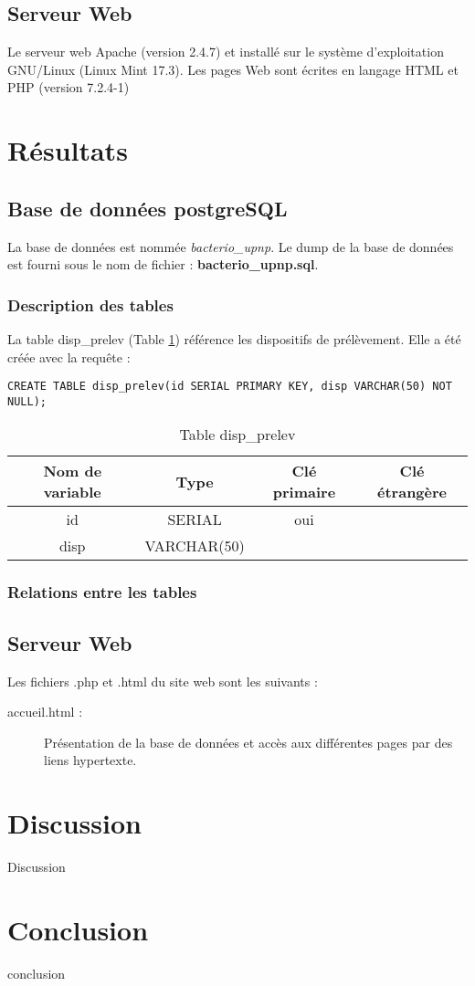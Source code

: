 \documentclass[12pt,a4paper,oneside]{article}
\begin{document}
\subsection{Serveur Web}
Le serveur web Apache (version 2.4.7) et installé sur le système d'exploitation GNU/Linux (Linux Mint 17.3).
Les pages Web sont écrites en langage HTML et PHP (version 7.2.4-1)

\section{Résultats}
\subsection{Base de données postgreSQL}
La base de données est nommée \emph{bacterio\_upnp}. Le dump de la base de données est fourni sous le nom de fichier : \textbf{bacterio\_upnp.sql}.


\subsubsection{Description des tables}

La table disp\_prelev (Table \ref{disp}) référence les dispositifs de prélèvement. Elle a été créée avec la requête :

\texttt{CREATE TABLE disp\_prelev(id SERIAL PRIMARY KEY, disp VARCHAR(50) NOT NULL);}

\begin{table}[h]
\caption{Table disp\_prelev \label{disp}}
\begin{center}
\begin{tabular}{|c|c|c|c|}
	\hline
	\textbf{Nom de variable} & \textbf{Type} & \textbf{Clé primaire} & \textbf{Clé étrangère}\\
	\hline
	id & SERIAL & oui &\\
	disp & VARCHAR(50)& &\\
	\hline
\end{tabular}
\end{center}
\end{table}

\subsubsection{Relations entre les tables}
\subsection{Serveur Web}
Les fichiers .php et .html du site web sont les suivants :
\begin{description}
\item[accueil.html :] Présentation de la base de données et accès aux différentes pages par des liens hypertexte.

\end{description}


\section{Discussion}
Discussion
\section{Conclusion}
conclusion
\end{document}
